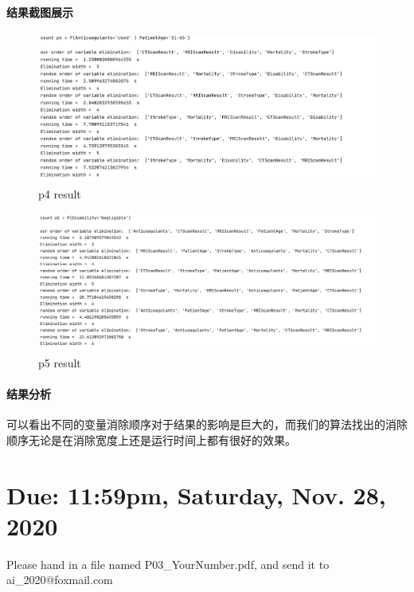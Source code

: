 \documentclass[a4paper, 11pt]{article}
\begin{document}
\begin{enumerate}
\paragraph{结果截图展示}
\begin{figure}[H]
\centering
\includegraphics[width=1\textwidth]{Pic/un4.png}
\caption{p4 result}
\end{figure}
\begin{figure}[H]
\centering
\includegraphics[width=1\textwidth]{Pic/un5.png}
\caption{p5 result}
\end{figure}
\paragraph{结果分析}
可以看出不同的变量消除顺序对于结果的影响是巨大的，而我们的算法找出的消除顺序无论是在消除宽度上还是运行时间上都有很好的效果。
\section{Due: 11:59pm, Saturday, Nov. 28, 2020}

 Please hand in a file named \textsf{P03\_YourNumber.pdf}, and send it to \textsf{ai\_2020@foxmail.com}
\end{enumerate}
\end{document}
